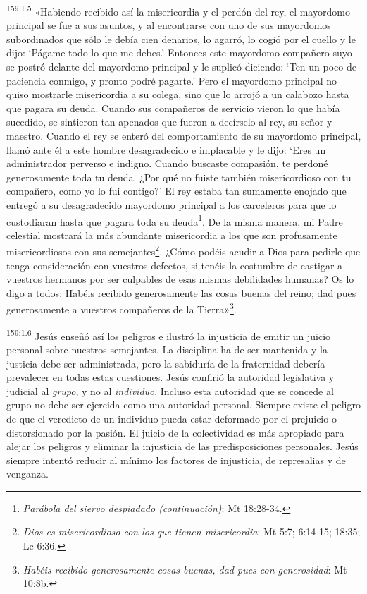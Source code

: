 \par
\textsuperscript{159:1.5} «Habiendo recibido así la misericordia y el perdón del rey, el mayordomo principal se fue a sus asuntos, y al encontrarse con uno de sus mayordomos subordinados que sólo le debía cien denarios, lo agarró, lo cogió por el cuello y le dijo: `Págame todo lo que me debes.' Entonces este mayordomo compañero suyo se postró delante del mayordomo principal y le suplicó diciendo: `Ten un poco de paciencia conmigo, y pronto podré pagarte.' Pero el mayordomo principal no quiso mostrarle misericordia a su colega, sino que lo arrojó a un calabozo hasta que pagara su deuda. Cuando sus compañeros de servicio vieron lo que había sucedido, se sintieron tan apenados que fueron a decírselo al rey, su señor y maestro. Cuando el rey se enteró del comportamiento de su mayordomo principal, llamó ante él a este hombre desagradecido e implacable y le dijo: `Eres un administrador perverso e indigno. Cuando buscaste compasión, te perdoné generosamente toda tu deuda. ¿Por qué no fuiste también misericordioso con tu compañero, como yo lo fui contigo?' El rey estaba tan sumamente enojado que entregó a su desagradecido mayordomo principal a los carceleros para que lo custodiaran hasta que pagara toda su deuda\footnote{\textit{Parábola del siervo despiadado (continuación)}: Mt 18:28-34.}. De la misma manera, mi Padre celestial mostrará la más abundante misericordia a los que son profusamente misericordiosos con sus semejantes\footnote{\textit{Dios es misericordioso con los que tienen misericordia}: Mt 5:7; 6:14-15; 18:35; Lc 6:36.}. ¿Cómo podéis acudir a Dios para pedirle que tenga consideración con vuestros defectos, si tenéis la costumbre de castigar a vuestros hermanos por ser culpables de esas mismas debilidades humanas? Os lo digo a todos: Habéis recibido generosamente las cosas buenas del reino; dad pues generosamente a vuestros compañeros de la Tierra»\footnote{\textit{Habéis recibido generosamente cosas buenas, dad pues con generosidad}: Mt 10:8b.}.

\par
\textsuperscript{159:1.6} Jesús enseñó así los peligros e ilustró la injusticia de emitir un juicio personal sobre nuestros semejantes. La disciplina ha de ser mantenida y la justicia debe ser administrada, pero la sabiduría de la fraternidad debería prevalecer en todas estas cuestiones. Jesús confirió la autoridad legislativa y judicial al \textit{grupo}, y no al \textit{individuo}. Incluso esta autoridad que se concede al grupo no debe ser ejercida como una autoridad personal. Siempre existe el peligro de que el veredicto de un individuo pueda estar deformado por el prejuicio o distorsionado por la pasión. El juicio de la colectividad es más apropiado para alejar los peligros y eliminar la injusticia de las predisposiciones personales. Jesús siempre intentó reducir al mínimo los factores de injusticia, de represalias y de venganza.

